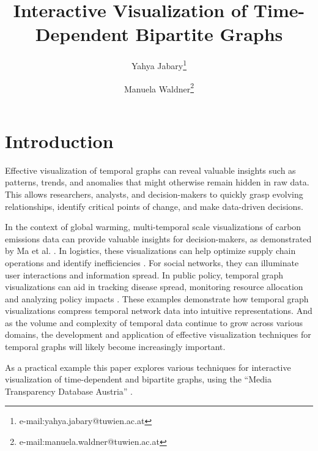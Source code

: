 \documentclass{vgtc}                          %
\title{Interactive Visualization of Time-Dependent Bipartite Graphs}
\author{Yahya Jabary\thanks{e-mail:yahya.jabary@tuwien.ac.at} %
\and Manuela Waldner\thanks{e-mail:manuela.waldner@tuwien.ac.at}}
\affiliation{\scriptsize Vienna University of Technology }
\begin{document}
  
\maketitle













\section{Introduction} %

Effective visualization of temporal graphs can reveal valuable insights such as patterns, trends, and anomalies that might otherwise remain hidden in raw data. This allows researchers, analysts, and decision-makers to quickly grasp evolving relationships, identify critical points of change, and make data-driven decisions.

In the context of global warming, multi-temporal scale visualizations of carbon emissions data can provide valuable insights for decision-makers, as demonstrated by Ma et al. \cite{ma2023histgnn}. In logistics, these visualizations can help optimize supply chain operations and identify inefficiencies \cite{Yang2019AnimatedMS} \cite{Tamilmani2019ModellingAA}. For social networks, they can illuminate user interactions and information spread. In public policy, temporal graph visualizations can aid in tracking disease spread, monitoring resource allocation and analyzing policy impacts \cite{chung2023temporal}.
These examples demonstrate how temporal graph visualizations compress temporal network data into intuitive representations. And as the volume and complexity of temporal data continue to grow across various domains, the development and application of effective visualization techniques for temporal graphs will likely become increasingly important.

\medskip

As a practical example this paper explores various techniques for interactive visualization of time-dependent and bipartite graphs, using the ``Media Transparency Database Austria'' \cite{dataset}.
\end{document}
